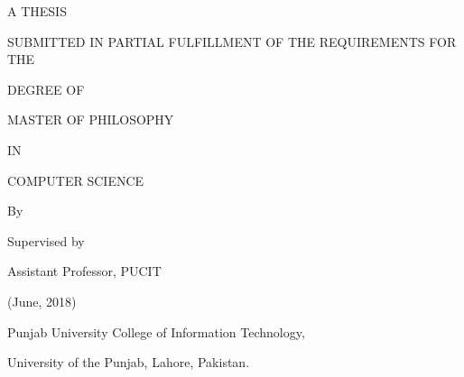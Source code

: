 \newpage
\begin{center}
\Large{\textbf{}}



A THESIS

SUBMITTED IN PARTIAL FULFILLMENT OF THE REQUIREMENTS FOR THE

DEGREE OF

MASTER OF PHILOSOPHY

IN

COMPUTER SCIENCE

\bigskip

    By

\large{\textbf{}}

\large{}

\bigskip
Supervised by

\large{\textbf{}}

Assistant Professor, PUCIT




\bigskip
(June, 2018)

\bigskip
Punjab University College of Information Technology,

\bigskip
University of the Punjab, Lahore, Pakistan.

\end{center}
\bigskip













%





